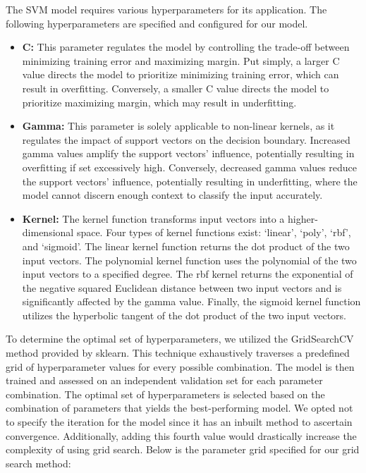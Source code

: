 \documentclass[english,bachelor]{swsLeipzig}
\begin{document}
The SVM model requires various hyperparameters for its application. The following hyperparameters are specified and 
configured for our model.

\begin{itemize}
  \item \textbf{C:} This parameter regulates the model by controlling the trade-off between minimizing training error and maximizing margin. Put simply, a larger C value directs the model to prioritize minimizing training error, which can result in overfitting. Conversely, a smaller C value directs the model to prioritize maximizing margin, which may result in underfitting.
  \item \textbf{Gamma:} This parameter is solely applicable to non-linear kernels, as it regulates the impact of support vectors on the decision boundary. Increased gamma values amplify the support vectors' influence, potentially resulting in overfitting if set excessively high. Conversely, decreased gamma values reduce the support vectors' influence, potentially resulting in underfitting, where the model cannot discern enough context to classify the input accurately.
  \item \textbf{Kernel:} The kernel function transforms input vectors into a higher-dimensional space. Four types of 
  kernel functions exist: `linear', `poly', `rbf', and `sigmoid'. The linear kernel function returns the dot product of the two input vectors. The polynomial kernel function uses the polynomial of the two input vectors to a specified degree. The rbf kernel returns the exponential of the negative squared Euclidean distance between two input vectors and is significantly affected by the gamma value. Finally, the sigmoid kernel function utilizes the hyperbolic tangent of the dot product of the two input vectors.
\end{itemize}

To determine the optimal set of hyperparameters, we utilized the GridSearchCV method provided by sklearn. This technique exhaustively traverses a predefined grid of hyperparameter values for every possible combination. The model is then trained and assessed on an independent validation set for each parameter combination. The optimal set of hyperparameters is selected based on the combination of parameters that yields the best-performing model. We opted not to specify the iteration for the model since it has an inbuilt method to ascertain convergence. Additionally, adding this fourth value would drastically increase the complexity of using grid search. Below is the parameter grid specified for our grid search method:
\end{document}
